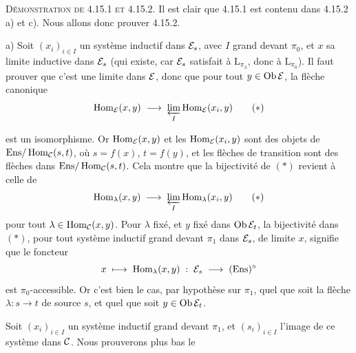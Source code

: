 \textsc{Démonstration de 4.15.1 et 4.15.2.} Il est clair que 4.15.1 est contenu dans 4.15.2 a) et c). Nous allons donc prouver 4.15.2.

a) Soit $(x_i)_{i\in I}$ un système inductif dans $\mathcal{E}_s$, avec $I$ grand devant $\pi_0$, et $x$ sa limite inductive dans $\mathcal{E}_s$ (qui existe, car $\mathcal{E}_s$ satisfait à $\mathrm{L}_{\pi_\lambda}$, donc à $\mathrm{L}_{\pi_0}$). Il faut prouver que c'est une limite dans $\mathcal{E}$, donc que pour tout $y \in \operatorname{Ob}\mathcal{E}$, la flèche canonique
\[
\operatorname{Hom}_{\mathcal{E}}(x,y) \;\longrightarrow\; \varprojlim_{I} \operatorname{Hom}_{\mathcal{E}}(x_i,y) \tag*{$(*)$}
\]

est un isomorphisme. Or $\operatorname{Hom}_{\mathcal{E}}(x,y)$ et les $\operatorname{Hom}_{\mathcal{E}}(x_i,y)$ sont des objets de $\mathrm{Ens}/\operatorname{Hom}_{\mathcal{C}}(s,t)$, où $s = f(x)$, $t = f(y)$, et les flèches de transition sont des flèches dans $\mathrm{Ens}/\operatorname{Hom}_{\mathcal{C}}(s,t)$. Cela montre que la bijectivité de $(*)$ revient à celle de
\[
\operatorname{Hom}_\lambda(x,y) \;\longrightarrow\; \varprojlim_{I} \operatorname{Hom}_\lambda(x_i,y) \tag*{$(*)$}
\]
pour tout $\lambda \in \operatorname{Hom}_{\mathcal{C}}(x,y)$. Pour $\lambda$ fixé, et $y$ fixé dans $\operatorname{Ob}\mathcal{E}_t$, la bijectivité dans $(*)$, pour tout système inductif grand devant $\pi_1$ dans $\mathcal{E}_s$, de limite $x$, signifie que le foncteur
\[
x \;\longmapsto\; \operatorname{Hom}_\lambda(x,y) \;:\; \mathcal{E}_s \;\longrightarrow\; (\mathrm{Ens})^\circ
\]
est $\pi_0$-accessible. Or c'est bien le cas, par hypothèse sur $\pi_1$, quel que soit la flèche $\lambda : s \longrightarrow t$ de source $s$, et quel que soit $y \in \operatorname{Ob}\mathcal{E}_t$.

Soit $(x_i)_{i\in I}$ un système inductif grand devant $\pi_1$, et $(s_i)_{i\in I}$ l'image de ce système dans $\mathcal{C}$. Nous prouverons plus bas le

